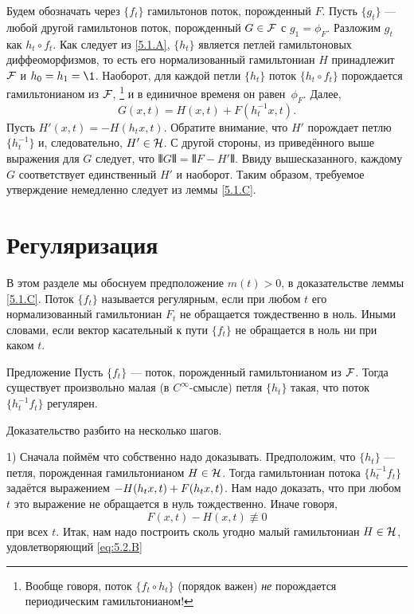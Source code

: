 Будем обозначать через $\{f_t\}$ гамильтонов поток, порожденный $F$.
Пусть $\{g_t\}$ — любой другой гамильтонов поток, порожденный $G \in \mathcal{F}$ с $g_1 = \phi_F$.
Разложим $g_t$ как $h_t \circ f_t$.
Как следует из \ref{5.1.A}, $\{h_t\}$ является петлей гамильтоновых диффеоморфизмов, то есть его нормализованный гамильтониан $H$ принадлежит $\mathcal{F}$ и $h_0 = h_1 = \1$.
Наоборот, для каждой петли $\{h_t\}$ поток $\{h_t \circ f_t\}$ порождается гамильтонианом из $\mathcal{F}$,%
\footnote{Вообще говоря, поток $\{f_t \circ h_t\}$ (порядок важен) {}\emph{не} порождается периодическим гамильтонианом!}
и в единичное временя он равен~$\phi_F$.
Далее, 
\[G (x, t) = H (x, t) + F (h^{-1}_t x, t).\]
Пусть $H' (x, t) = -H (h_t x, t)$.
Обратите внимание, что $H'$ порождает петлю $\{h^{-1}_t\}$ и, следовательно, $H'\in\mathcal{H}$.
С другой стороны, из приведённого выше выражения для $G$ следует, что $\VERT G \VERT = \VERT F - H' \VERT$.
Ввиду вышесказанного, каждому $G$ соответствует единственный $H'$ и наоборот.
Таким образом, требуемое утверждение немедленно следует из леммы \ref{5.1.C}.
\qeds

\section{Регуляризация}\label{5.2}

В этом разделе мы обоснуем предположение $m(t)>0$, в доказательстве леммы \ref{5.1.C}.
Поток $\{f_t\}$ называется регулярным, если при любом $t$ его нормализованный гамильтониан $F_t$ не обращается тождественно в ноль.
Иными словами, если вектор касательный к пути $\{f_t\}$ не
обращается в ноль ни при каком $t$.

\begin{thm}{Предложение}\label{5.2.A}
Пусть $\{f_t\}$ — поток, порожденный гамильтонианом из $\mathcal{F}$.
Тогда существует произвольно малая (в $C^\infty$-смысле) петля $\{h_t\}$ такая, что поток $\{h^{-1}_t f_t\}$ регулярен.
\end{thm}

Доказательство разбито на несколько шагов.

1) Сначала поймём что собственно надо доказывать.
Предположим, что $\{h_t\}$ — петля, порожденная гамильтонианом $H \in \mathcal{H}$.
Тогда гамильтониан потока $\{h^{-1}_t f_t\}$ задаётся выражением $-H (h_t x, t) \z+ F (h_t x, t)$.
Нам надо доказать, что при любом $t$ это выражение не обращается в нуль тождественно.
Иначе говоря,
\begin{equation}
F (x, t) - H (x, t) \not\equiv 0\label{eq:5.2.B}
\end{equation}
при всех $t$.
Итак, нам надо построить сколь угодно малый гамильтониан $H \in \mathcal{H}$, удовлетворяющий \ref{eq:5.2.B}

